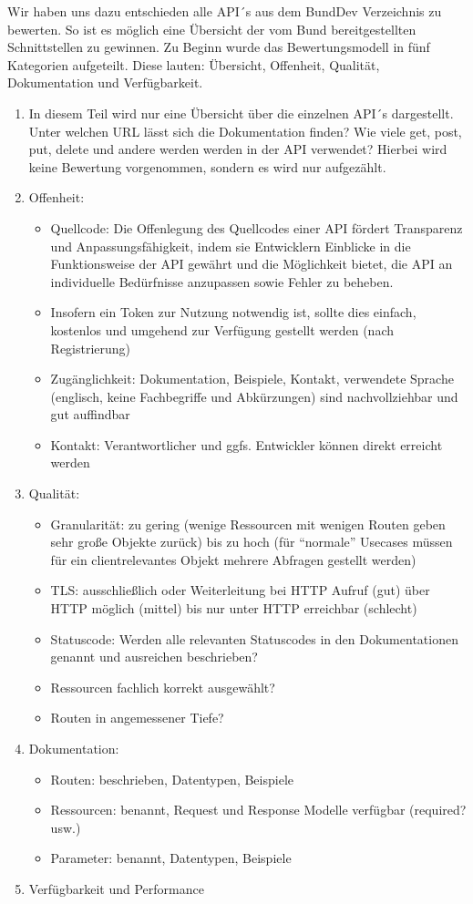 \documentclass[notitlepage, hidelinks]{article}
\begin{document}
Wir haben uns dazu entschieden alle API´s aus dem BundDev Verzeichnis zu bewerten. So ist es möglich eine Übersicht der vom Bund bereitgestellten Schnittstellen zu gewinnen. Zu Beginn wurde das Bewertungsmodell in fünf Kategorien aufgeteilt. Diese lauten: Übersicht, Offenheit, Qualität, Dokumentation und Verfügbarkeit.

\begin{enumerate}
\item In diesem Teil wird nur eine Übersicht über die einzelnen API´s dargestellt. Unter welchen URL lässt sich die Dokumentation finden? Wie viele get, post, put, delete und andere werden werden in der API verwendet? Hierbei wird keine Bewertung vorgenommen, sondern es wird nur aufgezählt.
\item Offenheit: 
\begin{itemize}
\item Quellcode: Die Offenlegung des Quellcodes einer API fördert Transparenz und Anpassungsfähigkeit, indem sie Entwicklern Einblicke in die Funktionsweise der API gewährt und die Möglichkeit bietet, die API an individuelle Bedürfnisse anzupassen sowie Fehler zu beheben.
\item Insofern ein Token zur Nutzung notwendig ist, sollte dies einfach, kostenlos und umgehend zur Verfügung gestellt werden (nach Registrierung)
\item Zugänglichkeit: Dokumentation, Beispiele, Kontakt, verwendete Sprache (englisch, keine Fachbegriffe und Abkürzungen) sind nachvollziehbar und gut auffindbar
\item Kontakt: Verantwortlicher und ggfs. Entwickler können direkt erreicht werden
\end{itemize}
\item Qualität: 
\begin{itemize}
\item Granularität: zu gering (wenige Ressourcen mit wenigen Routen geben sehr große Objekte zurück) bis zu hoch (für ``normale'' Usecases müssen für ein clientrelevantes Objekt mehrere Abfragen gestellt werden)
\item TLS: ausschließlich oder Weiterleitung bei HTTP Aufruf (gut) über HTTP möglich (mittel) bis nur unter HTTP erreichbar (schlecht)
\item Statuscode: Werden alle relevanten Statuscodes in den Dokumentationen genannt und ausreichen beschrieben?
\item Ressourcen fachlich korrekt ausgewählt?
\item Routen in angemessener Tiefe?
\end{itemize}
\item Dokumentation:
\begin{itemize}
\item Routen: beschrieben, Datentypen, Beispiele
\item Ressourcen: benannt, Request und Response Modelle verfügbar (required? usw.)
\item Parameter: benannt, Datentypen, Beispiele
\end{itemize}
\item Verfügbarkeit und Performance
\end{enumerate}
\end{document}
